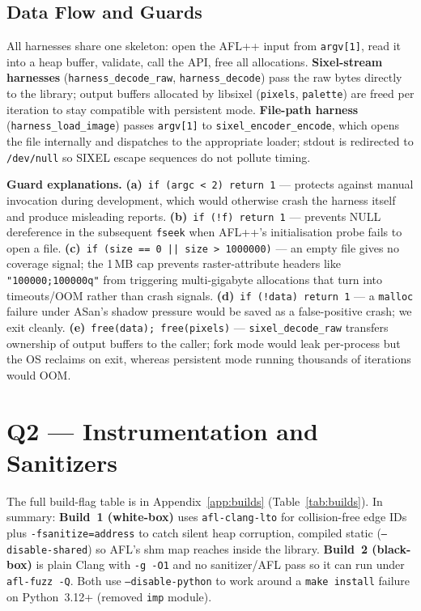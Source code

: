 \documentclass[letterpaper,twocolumn,10pt]{article}
\begin{document}
\subsection{Data Flow and Guards}
All harnesses share one skeleton: open the AFL++ input from \texttt{argv[1]},
read it into a heap buffer, validate, call the API, free all allocations.
\textbf{Sixel-stream harnesses} (\texttt{harness\_decode\_raw},
\texttt{harness\_decode}) pass the raw bytes directly to the library; output
buffers allocated by libsixel (\texttt{pixels}, \texttt{palette}) are freed per
iteration to stay compatible with persistent mode. \textbf{File-path harness}
(\texttt{harness\_load\_image}) passes \texttt{argv[1]} to
\texttt{sixel\_encoder\_encode}, which opens the file internally and dispatches
to the appropriate loader; stdout is redirected to \texttt{/dev/null} so SIXEL
escape sequences do not pollute timing.

\textbf{Guard explanations.}
\textbf{(a)}~\texttt{if (argc < 2) return 1} --- protects against manual
invocation during development, which would otherwise crash the harness itself
and produce misleading reports. \textbf{(b)}~\texttt{if (!f) return 1} ---
prevents NULL dereference in the subsequent \texttt{fseek} when AFL++'s
initialisation probe fails to open a file.
\textbf{(c)}~\texttt{if (size == 0 || size > 1000000)} --- an empty file gives
no coverage signal; the 1\,MB cap prevents raster-attribute headers like
\texttt{"100000;100000q"} from triggering multi-gigabyte allocations that turn
into timeouts/OOM rather than crash signals. \textbf{(d)}~\texttt{if (!data)
return 1} --- a \texttt{malloc} failure under ASan's shadow pressure would be
saved as a false-positive crash; we exit cleanly. \textbf{(e)}~\texttt{free(data);
free(pixels)} --- \texttt{sixel\_decode\_raw} transfers ownership of output
buffers to the caller; fork mode would leak per-process but the OS reclaims on
exit, whereas persistent mode running thousands of iterations would OOM.

\section{Q2 --- Instrumentation and Sanitizers}

The full build-flag table is in Appendix~\ref{app:builds}
(Table~\ref{tab:builds}). In summary: \textbf{Build~1 (white-box)} uses
\texttt{afl-clang-lto} for collision-free edge IDs plus
\texttt{-fsanitize=address} to catch silent heap corruption, compiled static
(\texttt{--disable-shared}) so AFL's shm map reaches inside the library.
\textbf{Build~2 (black-box)} is plain Clang with \texttt{-g -O1} and no
sanitizer/AFL pass so it can run under \texttt{afl-fuzz -Q}. Both use
\texttt{--disable-python} to work around a \texttt{make install} failure on
Python~3.12+ (removed \texttt{imp} module).
\end{document}
